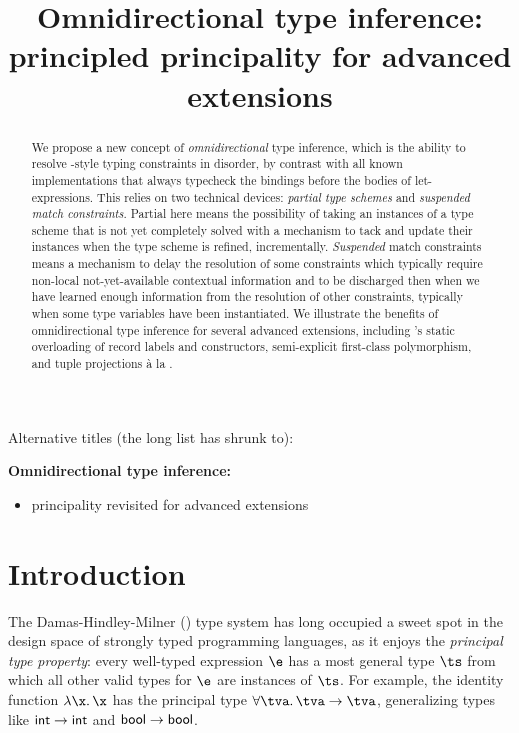 \documentclass[acmsmall,screen,nonacm]{acmart}
\title{Omnidirectional type inference:
  principled principality for advanced \ML extensions
}
\begin{document}
\begin{abstract}
We propose a new concept of \emph{omnidirectional} type inference, which is
the ability to resolve \ML-style typing constraints in disorder, by
contrast with all known implementations that always typecheck the
bindings before the bodies of let-expressions.
%
This relies on two technical devices: \emph{partial type schemes}
and \emph{suspended match constraints}. Partial here means  the
possibility of taking an instances of a type scheme that is not yet
completely solved with a mechanism to tack and update their instances when
the type scheme is refined, incrementally.
\emph{Suspended} match constraints means a mechanism to delay the resolution of
some constraints which typically require non-local not-yet-available
contextual information and to be discharged then when we have learned enough
information from the resolution of other constraints, typically when some type
variables have been instantiated.
%
We illustrate the benefits of omnidirectional type inference for several
advanced \ML extensions, including \OCaml's static overloading of
record labels and constructors, semi-explicit first-class polymorphism, and
tuple projections \`a la \SML.
\end{abstract}
\maketitle

\begin{version}[Titles]{\blue\True}
Alternative titles (the long list has shrunk to):

\medskip
\noindent \textbf{Omnidirectional type inference:}
\begin{itemize}
\item principality revisited for advanced \ML extensions
\end{itemize}

\end{version}

\section{Introduction}

The Damas-Hindley-Milner (\HM)  type system has long occupied a
sweet spot in the design space of strongly typed programming languages, as it
enjoys the \emph{principal type property}: every well-typed expression $\e$ has
a most general type $\ts$ from which all other valid types for $\e$ are
instances of $\ts$. For example, the identity function $\efun \x \x$ has
the principal type $\tfor \tv \tv \to \tv$, generalizing types like
$\mathsf{int} \to \mathsf{int}$ and $\mathsf{bool} \to \mathsf{bool}$.
\end{document}
